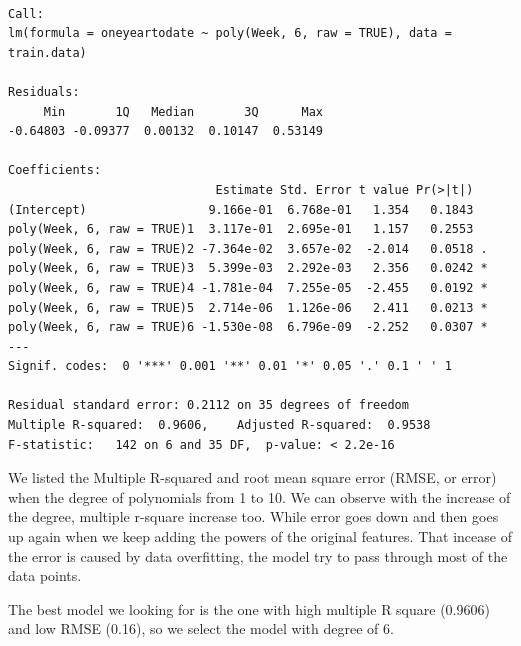 \documentclass[
  letterpaper,
  DIV=11,
  numbers=noendperiod]{scrreport}
\newenvironment{Shaded}{\begin{snugshade}}{\end{snugshade}}
\newcommand{\CommentTok}[1]{\textcolor[rgb]{0.37,0.37,0.37}{#1}}
\newcommand{\FunctionTok}[1]{\textcolor[rgb]{0.28,0.35,0.67}{#1}}
\newcommand{\NormalTok}[1]{\textcolor[rgb]{0.00,0.23,0.31}{#1}}
\newcommand{\OtherTok}[1]{\textcolor[rgb]{0.00,0.23,0.31}{#1}}
\newcommand{\SpecialCharTok}[1]{\textcolor[rgb]{0.37,0.37,0.37}{#1}}
\begin{document}
\begin{verbatim}

Call:
lm(formula = oneyeartodate ~ poly(Week, 6, raw = TRUE), data = train.data)

Residuals:
     Min       1Q   Median       3Q      Max 
-0.64803 -0.09377  0.00132  0.10147  0.53149 

Coefficients:
                             Estimate Std. Error t value Pr(>|t|)  
(Intercept)                 9.166e-01  6.768e-01   1.354   0.1843  
poly(Week, 6, raw = TRUE)1  3.117e-01  2.695e-01   1.157   0.2553  
poly(Week, 6, raw = TRUE)2 -7.364e-02  3.657e-02  -2.014   0.0518 .
poly(Week, 6, raw = TRUE)3  5.399e-03  2.292e-03   2.356   0.0242 *
poly(Week, 6, raw = TRUE)4 -1.781e-04  7.255e-05  -2.455   0.0192 *
poly(Week, 6, raw = TRUE)5  2.714e-06  1.126e-06   2.411   0.0213 *
poly(Week, 6, raw = TRUE)6 -1.530e-08  6.796e-09  -2.252   0.0307 *
---
Signif. codes:  0 '***' 0.001 '**' 0.01 '*' 0.05 '.' 0.1 ' ' 1

Residual standard error: 0.2112 on 35 degrees of freedom
Multiple R-squared:  0.9606,    Adjusted R-squared:  0.9538 
F-statistic:   142 on 6 and 35 DF,  p-value: < 2.2e-16
\end{verbatim}

\begin{Shaded}
\end{Shaded}

We listed the Multiple R-squared and root mean square error (RMSE, or
error) when the degree of polynomials from 1 to 10. We can observe with
the increase of the degree, multiple r-square increase too. While error
goes down and then goes up again when we keep adding the powers of the
original features. That incease of the error is caused by data
overfitting, the model try to pass through most of the data points.

The best model we looking for is the one with high multiple R square
(0.9606) and low RMSE (0.16), so we select the model with degree of 6.
\end{document}

